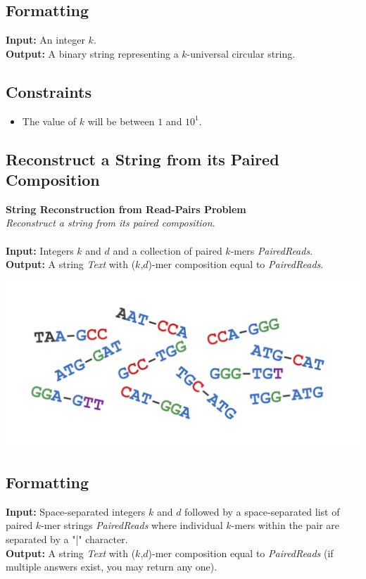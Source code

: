 \documentclass{article}
\begin{document}
\subsection*{Formatting}
\noindent\textbf{Input:} An integer $k$.\\
\noindent\textbf{Output:} A binary string representing a $k$-universal circular string.

\subsection*{Constraints}
\begin{itemize}
    \item The value of $k$ will be between $1$ and $10^1$.
\end{itemize}
\pagebreak

\subsection{Reconstruct a String from its Paired Composition}
\hline\vspace{5}
\textbf{String Reconstruction from Read-Pairs Problem}\\
\emph{Reconstruct a string from its paired composition}.\\ \\
\textbf{Input:} Integers $k$ and $d$ and a collection of paired $k$-mers \emph{PairedReads}.\\
\textbf{Output:} A string \emph{Text} with ($k$,$d$)-mer composition equal to \emph{PairedReads}.
\begin{center}
    \includegraphics[scale=0.2]{c3/logos/3J.png}
\end{center}
\hline\vspace{5}

\subsection*{Formatting}
\noindent\textbf{Input:} Space-separated integers $k$ and $d$ followed by a space-separated list of paired $k$-mer strings \emph{PairedReads} where individual $k$-mers within the pair are separated by a "|" character.\\
\noindent\textbf{Output:} A string \emph{Text} with ($k$,$d$)-mer composition equal to \emph{PairedReads} (if multiple answers exist, you may return any one).
\end{document}
